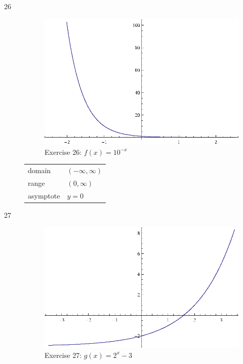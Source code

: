\documentclass{exam}
\begin{document}
\begin{description}
      \item[26] 
        \begin{figure}[H]
          \centering
          \includegraphics[scale=0.9]{exercise26.eps}
          \caption*{Exercise 26: $f(x) = 10^{-x}$}
        \end{figure}

        \begin{tabular}[H]{ll}
          \toprule
          domain    & $(-\infty, \infty)$ \\
          range     & $(0, \infty)$ \\
          asymptote & $y = 0$ \\
          \bottomrule
        \end{tabular}

      \item[27] 
        \begin{figure}[H]
          \centering
          \includegraphics[scale=0.9]{exercise27.eps}
          \caption*{Exercise 27: $g(x) = 2^x - 3$}
        \end{figure}


\end{description}
\end{document}
